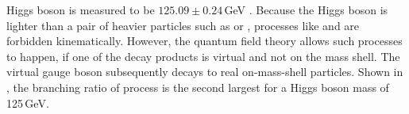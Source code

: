 Higgs boson is measured to be $125.09\pm0.24$\,GeV \cite{Agashe:2014kda}. Because the Higgs boson is lighter than a pair of heavier particles such as \HepProcess{\PWp\PWm} or \HepProcess{\PZ\PZ}, processes like \HepProcess{\PH \to \PWp\PWm} and \HepProcess{\PH \to \PZ\PZ} are forbidden kinematically. However,  the quantum field theory allows such processes to happen, if one of the decay products is virtual and not on the mass shell. The virtual gauge boson subsequently decays to real on-mass-shell particles. Shown in , the branching ratio of  \HepProcess{\PH \to \PWp\PWm} process is the second largest for a Higgs boson mass of 125\,GeV.

